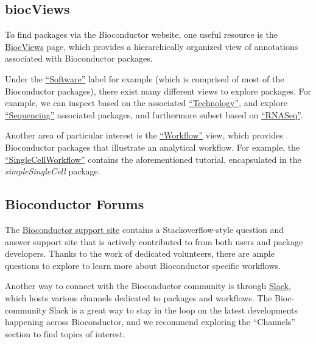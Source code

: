 \documentclass[]{book}
\begin{document}
\hypertarget{biocviews}{%
\subsection{biocViews}\label{biocviews}}

To find packages via the Bioconductor website, one useful resource is the \href{https://bioconductor.org/packages/release/BiocViews.html}{BiocViews} page, which provides a hierarchically organized view of annotations associated with Bioconductor packages.

Under the \href{https://bioconductor.org/packages/release/BiocViews.html\#___Software}{``Software''} label for example (which is comprised of most of the Bioconductor packages), there exist many different views to explore packages. For example, we can inspect based on the associated \href{https://bioconductor.org/packages/release/BiocViews.html\#___Technology}{``Technology''}, and explore \href{https://bioconductor.org/packages/release/BiocViews.html\#___Sequencing}{``Sequencing''} associated packages, and furthermore subset based on \href{https://bioconductor.org/packages/release/BiocViews.html\#___RNASeq}{``RNASeq''}.

Another area of particular interest is the \href{https://bioconductor.org/packages/release/BiocViews.html\#___Workflow}{``Workflow''} view, which provides Bioconductor packages that illustrate an analytical workflow. For example, the \href{https://bioconductor.org/packages/release/BiocViews.html\#___SingleCellWorkflow}{``SingleCellWorkflow''} contains the aforementioned tutorial, encapsulated in the \emph{simpleSingleCell} package.

\hypertarget{bioconductor-forums}{%
\subsection{Bioconductor Forums}\label{bioconductor-forums}}

The \href{https://support.bioconductor.org/}{Bioconductor support site} contains a Stackoverflow-style question and answer support site that is actively contributed to from both users and package developers. Thanks to the work of dedicated volunteers, there are ample questions to explore to learn more about Bioconductor specific workflows.

Another way to connect with the Bioconductor community is through \href{https://bioc-community.herokuapp.com}{Slack}, which hosts various channels dedicated to packages and workflows. The Bioc-community Slack is a great way to stay in the loop on the latest developments happening across Bioconductor, and we recommend exploring the ``Channels'' section to find topics of interest.
\end{document}

